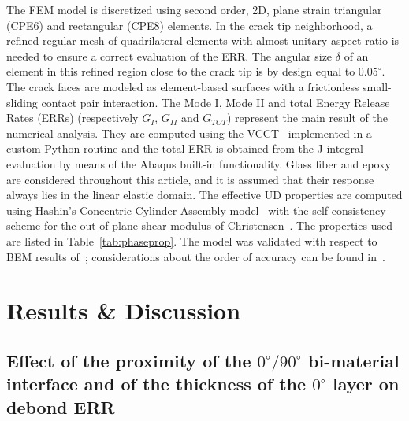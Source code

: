 \documentclass[review]{elsarticle}
\begin{document}
The FEM model is discretized using second order, 2D, plane strain triangular (CPE6) and rectangular (CPE8) elements. In the crack tip neighborhood, a refined regular mesh of quadrilateral elements with almost unitary aspect ratio is needed to ensure a correct evaluation of the ERR. The angular size $\delta$ of an element in this refined region close to the crack tip is by design equal to $0.05^{\circ}$. The crack faces are modeled as element-based surfaces with a frictionless small-sliding contact pair interaction. The Mode I, Mode II and total Energy Release Rates (ERRs) (respectively $G_{I}$, $G_{II}$ and $G_{TOT}$) represent the main result of the numerical analysis. They are computed using the VCCT~\cite{Krueger2004} implemented in a custom Python routine and the total ERR is obtained from the J-integral~\cite{Rice1968} evaluation by means of the Abaqus built-in functionality. Glass fiber and epoxy are considered throughout this article, and it is assumed that their response always lies in the linear elastic domain. The effective UD properties are computed using Hashin's Concentric Cylinder Assembly model~\cite{Hashin1983} with the self-consistency scheme for the out-of-plane shear modulus of Christensen~\cite{Christensen1979}. The properties used are listed in Table~\ref{tab:phaseprop}. The model was validated with respect to BEM results of~\cite{Paris2007,Sandino2016}; considerations about the order of accuracy can be found in~\cite{DiStasio2019}.


\section{Results \& Discussion}

\subsection{Effect of the proximity of the $0^{\circ}/90^{\circ}$ bi-material interface and of the thickness of the $0^{\circ}$ layer on debond ERR}\label{subsec:thickness}
\end{document}
